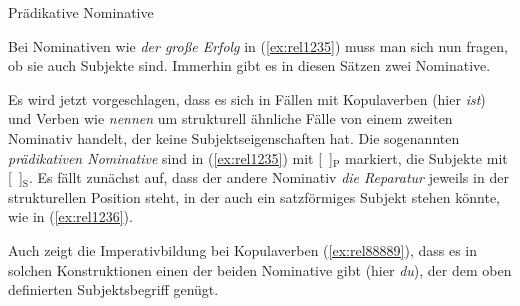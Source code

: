 \begin{Vertiefung}{Prädikative Nominative}

\label{vert:praednom}

\noindent Bei Nominativen wie \textit{der große Erfolg} in (\ref{ex:rel1235}) muss man sich nun fragen, ob sie auch Subjekte sind.
Immerhin gibt es in diesen Sätzen zwei Nominative.

\begin{exe}
  \ex\label{ex:rel1235}
  \begin{xlist}
  \end{xlist}
\end{exe}

Es wird jetzt vorgeschlagen, dass es sich in Fällen mit Kopulaverben (hier \textit{ist}) und Verben wie \textit{nennen} um strukturell ähnliche Fälle von einem zweiten Nominativ handelt, der keine Subjektseigenschaften hat.
Die sogenannten \textit{prädikativen Nominative} sind in (\ref{ex:rel1235}) mit [~]$_\textrm{P}$ markiert, die Subjekte mit [~]$_\textrm{S}$.
Es fällt zunächst auf, dass der andere Nominativ \textit{die Reparatur} jeweils in der strukturellen Position steht, in der auch ein satzförmiges Subjekt stehen könnte, wie in (\ref{ex:rel1236}).

\begin{exe}
  \ex\label{ex:rel1236}
  \begin{xlist}
  \end{xlist}
\end{exe}

Auch zeigt die Imperativbildung bei Kopulaverben (\ref{ex:rel88889}), dass es in solchen Konstruktionen einen der beiden Nominative gibt (hier \textit{du}), der dem oben definierten Subjektsbegriff genügt.

\begin{exe}
  \ex\label{ex:rel88889}
  \begin{xlist}
  \end{xlist}
\end{exe}


\end{Vertiefung}
